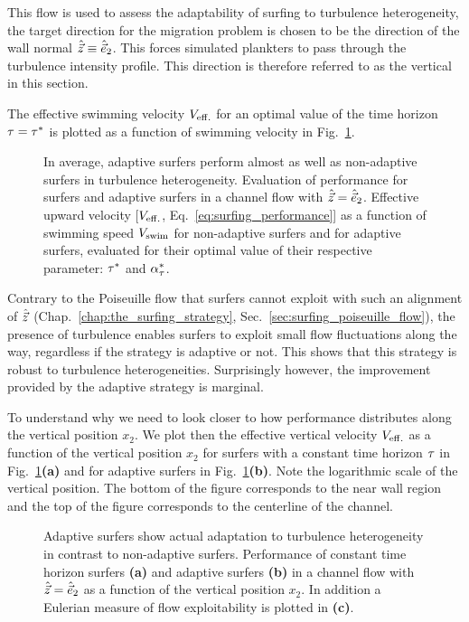 This flow is used to assess the adaptability of surfing to turbulence heterogeneity, the target direction for the migration problem is chosen to be the direction of the wall normal $\hat{\vec{z}} \equiv \hat{\vec{e}}_2$.
This forces simulated plankters to pass through the turbulence intensity profile.
This direction is therefore referred to as the vertical in this section.

The effective swimming velocity $V_{\mathrm{eff.}}$ for an optimal value of the time horizon $\tau = \tau^*$ is plotted as a function of swimming velocity in Fig.~\ref{fig:channel_perf_y}.
\begin{figure}
	\centering
	
	\caption[In average, adaptive surfers perform almost as well as non-adaptive surfers in turbulence heterogeneity.]{
		In average, adaptive surfers perform almost as well as non-adaptive surfers in turbulence heterogeneity.
		Evaluation of performance for surfers and adaptive surfers in a channel flow with $\hat{\vec{z}} = \hat{\vec{e}}_2$.
		Effective upward velocity [$V_{\mathrm{eff.}}$, Eq.~\eqref{eq:surfing_performance}] as a function of swimming speed $V_{\mathrm{swim}}$ for non-adaptive surfers and for adaptive surfers, evaluated for their optimal value of their respective parameter: $\tau^*$ and  $\alpha_{\tau}^*$.
	}
	\label{fig:channel_perf_y}
\end{figure}
Contrary to the Poiseuille flow that surfers cannot exploit with such an alignment of $\hat{\vec{z}}$ (Chap.~\ref{chap:the_surfing_strategy}, Sec.~\ref{sec:surfing_poiseuille_flow}), the presence of turbulence enables surfers to exploit small flow fluctuations along the way, regardless if the strategy is adaptive or not.
This shows that this strategy is robust to turbulence heterogeneities.
Surprisingly however, the improvement provided by the adaptive strategy is marginal.

To understand why we need to look closer to how performance distributes along the vertical position $x_2$.
We plot then the effective vertical velocity $V_{\mathrm{eff.}}$ as a function of the vertical position $x_2$ for surfers with a constant time horizon $\tau$ in Fig.~\ref{fig:channel_perf_y}\textbf{(a)} and for adaptive surfers in Fig.~\ref{fig:channel_perf_y}\textbf{(b)}.
Note the logarithmic scale of the vertical position.
The bottom of the figure corresponds to the near wall region and the top of the figure corresponds to the centerline of the channel.
\begin{figure}
	\centering
	
	\caption[Adaptive surfers show actual adaptation to turbulence heterogeneity in contrast to non-adaptive surfers.]{
		Adaptive surfers show actual adaptation to turbulence heterogeneity in contrast to non-adaptive surfers.
		Performance of constant time horizon surfers \textbf{(a)} and adaptive surfers \textbf{(b)} in a channel flow with $\hat{\vec{z}} = \hat{\vec{e}}_2$ as a function of the vertical position $x_2$. 
		In addition a Eulerian measure of flow exploitability is plotted in \textbf{(c)}.
	}
	\label{fig:channel_binned_velocity_y}
\end{figure}

